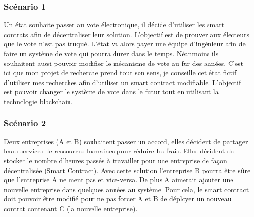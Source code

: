 \subsubsection{Scénario 1}

Un état souhaite passer au vote électronique, il décide d’utiliser les smart contrats afin de
décentraliser leur solution. L’objectif est de prouver aux électeurs que le vote n’est pas truqué. L’état va
alors payer une équipe d’ingénieur afin de faire un système de vote qui pourra durer dans le temps.
Néanmoins ils souhaitent aussi pouvoir modifier le mécanisme de vote au fur des années. C’est ici que
mon projet de recherche prend tout son sens, je conseille cet état fictif d’utiliser mes recherches afin
d’utiliser un smart contract modifiable. L’objectif est pouvoir changer le système de vote dans le futur
tout en utilisant la technologie blockchain.

\subsubsection{Scénario 2}

Deux entreprises (A et B) souhaitent passer un accord, elles décident de partager leurs services
de ressources humaines pour réduire les frais. Elles décident de stocker le nombre d’heures passés à
travailler pour une entreprise de façon décentralisée (Smart Contract). Avec cette solution l’entreprise B
pourra être sûre que l’entreprise A ne ment pas et vice-versa. De plus A aimerait ajouter une nouvelle
entreprise dans quelques années au système. 
Pour cela, le smart contract doit pouvoir être modifié pour ne pas forcer A et
B de déployer un nouveau contrat contenant C (la nouvelle entreprise).
